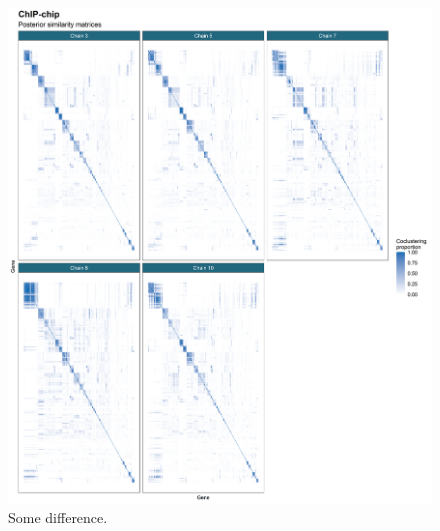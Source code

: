 \documentclass[]{article}
\begin{document}
\begin{figure}
	\centering
	\includegraphics[scale=0.5]{./Images/Yeast/ChIP-chipPSMcomparisonReduced.png}
	\caption{Some difference.}
	\label{fig:chipchipPSMs}
\end{figure}
\end{document}
